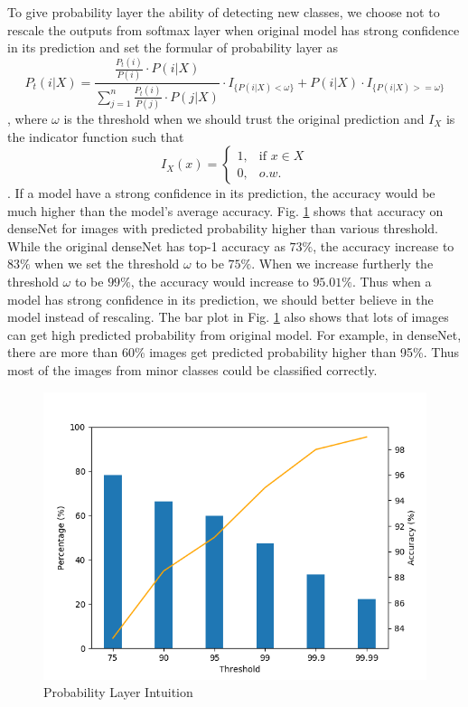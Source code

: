 \documentclass{article}
\begin{document}
To give probability layer the ability of detecting new classes, we choose not to rescale the outputs from softmax layer when original model has strong confidence in its prediction and set the formular of probability layer as
\begin{equation}
    P_t(i|X) = \frac{\frac{P_t(i)}{P(i)} \cdot P(i|X)}{\sum_{j=1}^n \frac{P_t(i)}{P(j)} \cdot P(j|X)} \cdot I_{\{P(i|X) < \omega\}} + P(i|X) \cdot I_{\{P(i|X) >= \omega\}}
\end{equation}
, where $\omega$ is the threshold when we should trust the original prediction and $I_X$ is the indicator function such that
\begin{equation}
I_X(x) = \begin{cases}
1, &\text{if $x \in X$}\\
0, &\text{$o.w.$}
\end{cases}
\end{equation}
. If a model have a strong confidence in its prediction, the accuracy would be much higher than the model's average accuracy. Fig. \ref{fig:threshold} shows that accuracy on denseNet for images with predicted probability higher than various threshold. While the original denseNet has top-1 accuracy as $73\%$, the accuracy increase to $83\%$ when we set the threshold $\omega$ to be $75\%$. When we increase furtherly the threshold $\omega$ to be $99\%$, the accuracy would increase to $95.01\%$. Thus when a model has strong confidence in its prediction, we should better believe in the model instead of rescaling. The bar plot in Fig. \ref{fig:threshold} also shows that lots of images can get high predicted probability from original model. For example, in denseNet, there are more than 60\% images get predicted probability higher than 95\%. Thus most of the images from minor classes could be classified correctly. 

\begin{figure}
\centering
\includegraphics[scale = 0.6]{threshold.png}
\caption{Probability Layer Intuition}
\label{fig:threshold}
\end{figure}
\end{document}
